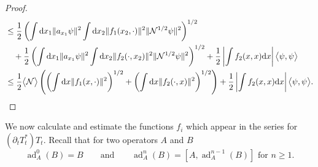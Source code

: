 \documentclass[11pt,a4paper,draft,DIV11]{scrartcl}	%
\newcommand{\ad}{\operatorname{ad}}	%
\newcommand{\di}{\textrm{d}}		%
\newcommand{\Ncal}{\mathcal{N}}		%
\newcommand{\scal}[2]{\big<#1,#2\big>} %
\newcommand{\norm}[1]{\lVert#1\rVert}	%
\newcommand{\ev}[1]{\big<#1\big>}	%
\begin{document}
\begin{proof}
\begin{align*}
& \leq \frac{1}{2} \left( \int \di x_1 \norm{a_{x_1}\psi}^2 \int \di x_2 \norm{f_1(x_2,\cdot)}^2 \norm{\Ncal^{1/2}\psi}^2 \right)^{1/2}\\
& \quad + \frac{1}{2} \left( \int \di x_1 \norm{a_{x_1}\psi}^2 \int \di x_2 \norm{f_2(\cdot,x_2)}^2 \norm{\Ncal^{1/2}\psi}^2 \right)^{1/2} + \frac{1}{2}\left\lvert \int f_2(x,x) \di x\right\rvert \scal{\psi}{\psi} \\
& \leq \frac{1}{2}\ev{\Ncal} \left(\left(\int \di x \norm{f_1(x,\cdot)}^2 \right)^{1/2} + \left(\int \di x \norm{f_2(\cdot,x)}^2 \right)^{1/2} \right) + \frac{1}{2}\left\lvert \int f_2(x,x) \di x\right\rvert \scal{\psi}{\psi}. 	\qedhere
 \end{align*}
\end{proof}

We now calculate and estimate the functions $f_i$ which appear in the series for $(\partial_t T^*_t)T_t$. Recall that for two operators $A$ and $B$
\[
 \ad^0_A(B) = B \qquad \mbox{and} \qquad \ad^n_A(B) = [A,\ad^{n-1}_A(B)] \mbox{ for } n \geq 1.
\]
\end{document}
